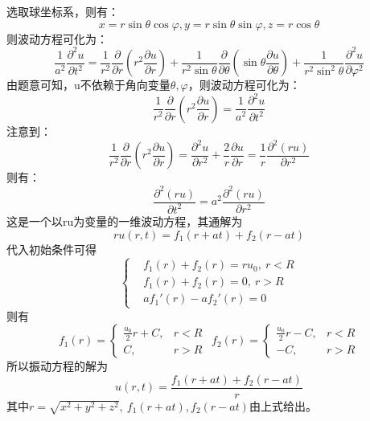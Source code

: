 \documentclass[10.5pt]{article}
\begin{document}
\section{}
选取球坐标系，则有：$$x=r\sin\theta\cos\varphi,y=r\sin\theta\sin\varphi,z=r\cos\theta$$\indent
则波动方程可化为：$$\frac{1}{a^2}\frac{\partial^2u}{\partial t^2}=\frac{1}{r^2}\frac{\partial}{\partial r}\left(r^2\frac{\partial u}{\partial r}\right)+\frac{1}{r^2\sin\theta}\frac{\partial}{\partial \theta}\left(\sin\theta\frac{\partial u}{\partial\theta}\right)+\frac{1}{r^2\sin^2\theta}\frac{\partial^2u}{\partial\varphi^2}$$\indent
由题意可知，u不依赖于角向变量$\theta,\varphi$，则波动方程可化为：$$\frac{1}{r^2}\frac{\partial}{\partial r}\left(r^2\frac{\partial u}{\partial r}\right)=\frac{1}{a^2}\frac{\partial^2u}{\partial t^2}$$\indent
注意到：$$\frac{1}{r^2}\frac{\partial}{\partial r}\left(r^2\frac{\partial u}{\partial r}\right)=\frac{\partial^2u}{\partial r^2}+\frac{2}{r}\frac{\partial u}{\partial r}=\frac{1}{r}\frac{\partial^2(ru)}{\partial r^2}$$\indent
则有：$$\frac{\partial^2(ru)}{\partial t^2}=a^2\frac{\partial^2(ru)}{\partial r^2}$$\indent
这是一个以ru为变量的一维波动方程，其通解为$$ru(r,t)=f_1(r+at)+f_2(r-at)$$\indent
代入初始条件可得$$\left\{\begin{aligned}
    &f_1(r)+f_2(r)=ru_0,~r<R\\
    &f_1(r)+f_2(r)=0,~r>R\\
    &af_1'(r)-af_2'(r)=0
\end{aligned}\right.$$\indent
则有$$f_1(r)=\begin{cases}
    \frac{u_0}{2}r+C,&r<R\\
    C,&r>R
\end{cases}~~f_2(r)=\begin{cases}
    \frac{u_0}{2}r-C,&r<R\\
    -C,&r>R
\end{cases}$$\indent
所以振动方程的解为$$u(r,t)=\frac{f_1(r+at)+f_2(r-at)}{r}$$\indent
其中$r=\sqrt{x^2+y^2+z^2},~f_1(r+at),f_2(r-at)$由上式给出。
\end{document}

